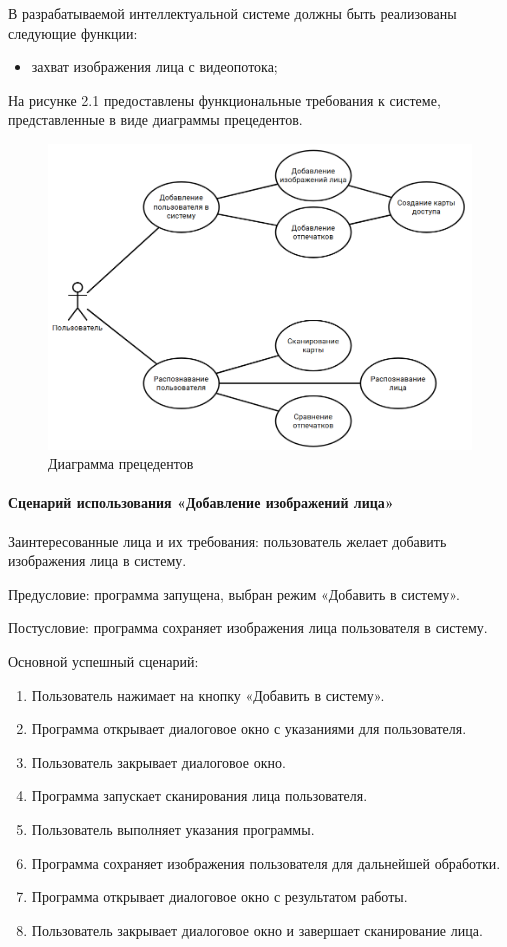 В разрабатываемой интеллектуальной системе должны
быть реализованы следующие функции: 
\begin{itemize}
    \item захват изображения лица с видеопотока;
\end{itemize}

На рисунке 2.1 предоставлены функциональные требования к системе,
представленные в виде диаграммы прецедентов.
\begin{figure}[H]
	\centering
	\includegraphics[width=1\linewidth]{images/UML}
	\caption{Диаграмма прецедентов}
	\label{fig:uml}
\end{figure}

\paragraph{Сценарий использования «Добавление изображений лица»}

Заинтересованные лица и их требования: пользователь желает добавить изображения лица в систему.

Предусловие: программа запущена, выбран режим «Добавить в систему».

Постусловие: программа сохраняет изображения лица пользователя  в систему.

Основной успешный сценарий:
\begin{enumerate}
	\item Пользователь нажимает на кнопку «Добавить в систему».
	\item Программа открывает диалоговое окно с указаниями для пользователя.
	\item Пользователь закрывает диалоговое окно.
	\item Программа запускает сканирования лица пользователя.
	\item Пользователь выполняет указания программы.
	\item Программа сохраняет изображения пользователя для дальнейшей обработки.
	\item Программа открывает диалоговое окно с результатом работы.
	\item Пользователь закрывает диалоговое окно и завершает сканирование лица.
\end{enumerate}

